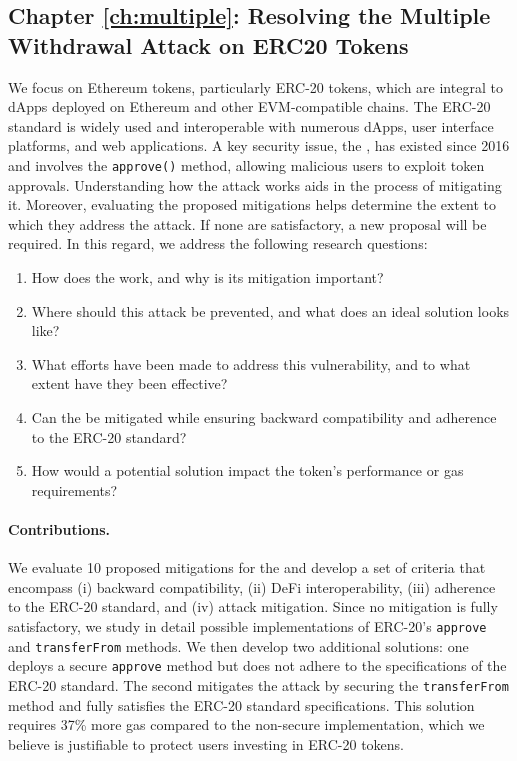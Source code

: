 \subsection{Chapter \ref{ch:multiple}: Resolving the Multiple Withdrawal Attack on ERC20 Tokens}
We focus on Ethereum tokens, particularly ERC-20 tokens, which are integral to dApps deployed on Ethereum and other EVM-compatible chains. The ERC-20 standard is widely used and interoperable with numerous dApps, user interface platforms, and web applications. A key security issue, the \mwa, has existed since 2016 and involves the \texttt{approve()} method, allowing malicious users to exploit token approvals. Understanding how the attack works aids in the process of mitigating it. Moreover, evaluating the proposed mitigations helps determine the extent to which they address the attack. If none are satisfactory, a new proposal will be required. In this regard, we address the following research questions:
\begin{enumerate}[label={(RQ3.\arabic*)},leftmargin=*]
	\item How does the \mwa work, and why is its mitigation important?
	\item Where should this attack be prevented, and what does an ideal solution looks like?
	\item What efforts have been made to address this vulnerability, and to what extent have they been effective?
	\item Can the \mwa be mitigated while ensuring backward compatibility and adherence to the ERC-20 standard?
	\item How would a potential solution impact the token's performance or gas requirements?
\end{enumerate}
\paragraph{Contributions.} We evaluate 10 proposed mitigations for the \mwa and develop a set of criteria that encompass (i) backward compatibility, (ii) DeFi interoperability, (iii) adherence to the ERC-20 standard, and (iv) attack mitigation. Since no mitigation is fully satisfactory, we study in detail possible implementations of ERC-20's \texttt{approve} and \texttt{transferFrom} methods. We then develop two additional solutions: one deploys a secure \texttt{approve} method but does not adhere to the specifications of the ERC-20 standard. The second mitigates the attack by securing the \texttt{transferFrom} method and fully satisfies the ERC-20 standard specifications. This solution requires 37\% more gas compared to the non-secure implementation, which we believe is justifiable to protect users investing in ERC-20 tokens.

